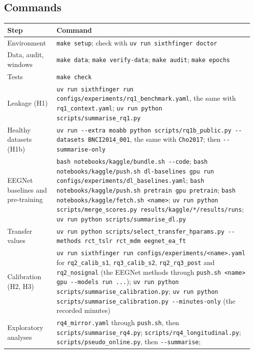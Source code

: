 \subsection*{Commands}

\begin{center}
\footnotesize
\begin{tabularx}{\textwidth}{@{}>{\raggedright\arraybackslash}p{3.0cm}>{\raggedright\arraybackslash}X@{}}
\toprule
Step & Command \\
\midrule
Environment & \texttt{make setup}; check with \texttt{uv run sixthfinger doctor} \\
Data, audit, windows & \texttt{make data}; \texttt{make verify-data}; \texttt{make audit};
\texttt{make epochs} \\
Tests & \texttt{make check} \\
Leakage (H1) & \texttt{uv run sixthfinger run configs/experiments/rq1\_benchmark.yaml}, the
same with \texttt{rq1\_context.yaml}; \texttt{uv run python scripts/summarise\_rq1.py} \\
Healthy datasets (H1b) & \texttt{uv run -{}-extra moabb python scripts/rq1b\_public.py
-{}-datasets BNCI2014\_001}, the same with \texttt{Cho2017}; then
\texttt{-{}-summarise-only} \\
EEGNet baselines and pre-training & \texttt{bash notebooks/kaggle/bundle.sh -{}-code};
\texttt{bash notebooks/kaggle/push.sh dl-baselines gpu run
configs/experiments/dl\_baselines.yaml}; \texttt{bash notebooks/kaggle/push.sh pretrain gpu
pretrain}; \texttt{bash notebooks/kaggle/fetch.sh <name>}; \texttt{uv run python
scripts/merge\_scores.py results/kaggle/*/results/runs}; \texttt{uv run python
scripts/summarise\_dl.py} \\
Transfer values & \texttt{uv run python scripts/select\_transfer\_hparams.py -{}-methods
rct\_tslr rct\_mdm eegnet\_ea\_ft} \\
Calibration (H2, H3) & \texttt{uv run sixthfinger run configs/experiments/<name>.yaml} for
\texttt{rq2\_calib\_s1}, \texttt{rq3\_calib\_s2}, \texttt{rq2\_rq3\_post} and
\texttt{rq2\_nosignal} (the EEGNet methods through \texttt{push.sh <name> gpu -{}-models run
...}); \texttt{uv run python scripts/summarise\_calibration.py};
\texttt{uv run python scripts/summarise\_calibration.py -{}-minutes-only} (the
recorded minutes) \\
Exploratory analyses & \texttt{rq4\_mirror.yaml} through \texttt{push.sh}, then
\texttt{scripts/summarise\_rq4.py}; \texttt{scripts/rq4\_longitudinal.py};
\texttt{scripts/pseudo\_online.py}, then \texttt{-{}-summarise};

\end{tabularx}
\end{center}
